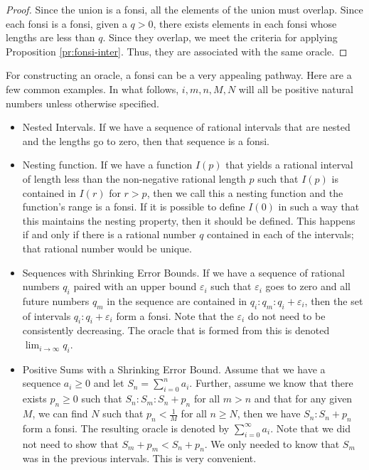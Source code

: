 \documentclass[12pt]{article}
\begin{document}
\begin{proof}
    Since the union is a fonsi, all the elements of the union must overlap. Since each fonsi is a fonsi, given a $q > 0$, there exists elements in each fonsi whose lengths are less than $q$. Since they overlap, we meet the criteria for applying Proposition \ref{pr:fonsi-inter}. Thus, they are associated with the same oracle. 
\end{proof}

For constructing an oracle, a fonsi can be a very appealing pathway.  Here are a few common examples. In what follows, $i, m, n, M, N$ will all be positive natural numbers unless otherwise specified.

\begin{itemize}
    \item Nested Intervals. If we have a sequence of rational intervals that are nested and the lengths go to zero, then that sequence is a fonsi.
    
    \item Nesting function. If we have a function $I(p)$ that yields a rational interval of length less than the non-negative rational length $p$ such that $I(p)$ is contained in $I(r)$ for $r>p$, then we call this a nesting function and the function's range is a fonsi. If it is possible to define $I(0)$ in such a way that this maintains the nesting property, then it should be defined. This happens if and only if there is a rational number $q$ contained in each of the intervals; that rational number would be unique. 
    
    \item Sequences with Shrinking Error Bounds. If we have a sequence of rational numbers $q_i$ paired with an upper bound $\varepsilon_i$ such that $\varepsilon_i$ goes to zero and all future numbers $q_m$ in the sequence are contained in $q_i:q_m:q_i+\varepsilon_i$, then the set of intervals $q_i:q_i+\varepsilon_i$ form a fonsi. Note that the $\varepsilon_i$ do not need to be consistently decreasing. The oracle that is formed from this is denoted $\lim_{i \to \infty} q_i $. 
    
    \item Positive Sums with a Shrinking Error Bound. Assume that we have a sequence $a_i\geq 0$ and let $S_n = \sum_{i=0}^n a_i$. Further, assume we know that there exists $p_n \geq 0$ such that $S_n: S_m : S_n + p_n$ for all $m > n$ and that for any given $M$, we can find $N$ such that $p_n < \frac{1}{M}$ for all $n \geq N$, then we have $S_n: S_n + p_n$ form a fonsi. The resulting oracle is denoted by $\sum_{i=0}^\infty a_i$. Note that we did not need to show that $S_m+p_m < S_n + p_n$. We only needed to know that $S_m$ was in the previous intervals. This is very convenient.
    

\end{itemize}
\end{document}
